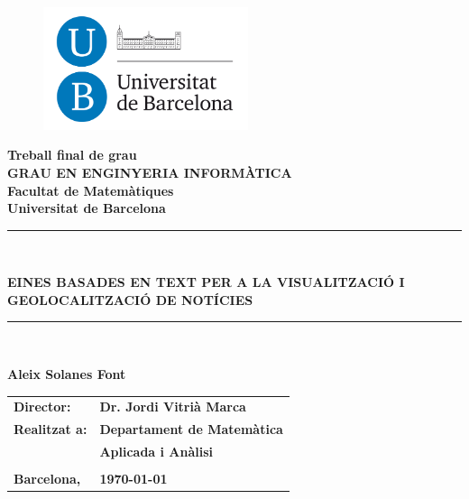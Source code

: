 \documentclass[12pt,a4paper,openright,oneside]{article}
\numberwithin{equation}{section}
\theoremstyle{definition}
\begin{document}

\thispagestyle{empty}

\begin{titlepage}
\begin{center}
\begin{figure}[htb]
\begin{center}
\includegraphics[width=6cm]{ub.png}
\end{center}
\end{figure}

\textbf{\LARGE Treball final de grau} \\
\vspace*{.5cm}
\textbf{\LARGE GRAU EN ENGINYERIA INFORMÀTICA } \\
\vspace*{.5cm}
\textbf{\LARGE Facultat de Matemàtiques \\ Universitat de Barcelona} \\
\vspace*{1.5cm}
\rule{16cm}{0.1mm}\\
\begin{Huge}
\textbf{EINES BASADES EN TEXT PER A LA VISUALITZACIÓ I GEOLOCALITZACIÓ DE NOTÍCIES} \\
\end{Huge}
\rule{16cm}{0.1mm}\\

\vspace{1cm}


\begin{center}
\textbf{\LARGE Aleix Solanes Font}
\end{center}
\begin{flushright}
\vspace*{2cm}

\renewcommand{\arraystretch}{1.5}
\begin{tabular}{ll}
\textbf{\Large Director:} & \textbf{\Large Dr. Jordi Vitrià Marca} \\
\textbf{\Large Realitzat a:} & \textbf{\Large  Departament de Matemàtica     } \\
 & \textbf{\Large Aplicada i Anàlisi} \\
\\
\textbf{\Large Barcelona,} & \textbf{\Large \today }
\end{tabular}

\end{flushright}

\end{center}










\end{titlepage}
\end{document}
